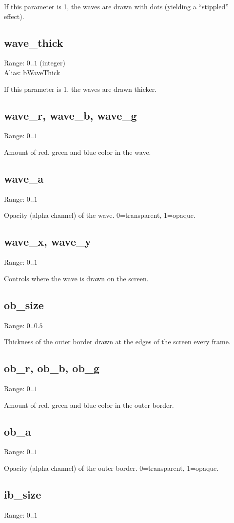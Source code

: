 \documentclass[11pt, a5paper, pagesize]{scrbook}
\begin{document}
If this parameter is 1, the waves are drawn with dots (yielding a ``stippled'' effect).

\subsection{wave\_thick}
Range: $0..1$ (integer)\\
Alias: bWaveThick

If this parameter is 1, the waves are drawn thicker.

\subsection{wave\_r, wave\_b, wave\_g}
Range: $0..1$

Amount of red, green and blue color in the wave.

\subsection{wave\_a}
Range: $0..1$

Opacity (alpha channel) of the wave. 0=transparent, 1=opaque.

\subsection{wave\_x, wave\_y}
Range: $0..1$

Controls where the wave is drawn on the screen.

\subsection{ob\_size}
Range: $0..0.5$

Thickness of the outer border drawn at the edges of the screen every frame.

\subsection{ob\_r, ob\_b, ob\_g}
Range: $0..1$

Amount of red, green and blue color in the outer border.

\subsection{ob\_a}
Range: $0..1$

Opacity (alpha channel) of the outer border. 0=transparent, 1=opaque.

\subsection{ib\_size}
Range: $0..1$
\end{document}
